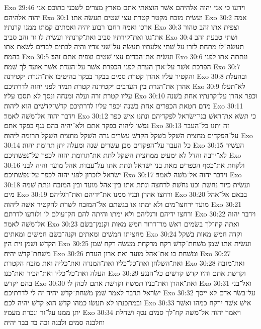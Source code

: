 Exo 29:46  וידעו כי אני יהוה אלהיהם אשׁר הוצאתי אתם מארץ מצרים לשׁכני בתוכם אני יהוה אלהיהם׃
Exo 30:1  ועשׂית מזבח מקטר קטרת עצי שׁטים תעשׂה אתו׃
Exo 30:2  אמה ארכו ואמה רחבו רבוע יהיה ואמתים קמתו ממנו קרנתיו׃
Exo 30:3  וצפית אתו זהב טהור את־גגו ואת־קירתיו סביב ואת־קרנתיו ועשׂית לו זר זהב סביב׃
Exo 30:4  ושׁתי טבעת זהב תעשׂה־לו מתחת לזרו על שׁתי צלעתיו תעשׂה על־שׁני צדיו והיה לבתים לבדים לשׂאת אתו בהמה׃
Exo 30:5  ועשׂית את־הבדים עצי שׁטים וצפית אתם זהב׃
Exo 30:6  ונתתה אתו לפני הפרכת אשׁר על־ארן העדת לפני הכפרת אשׁר על־העדת אשׁר אועד לך שׁמה׃
Exo 30:7  והקטיר עליו אהרן קטרת סמים בבקר בבקר בהיטיבו את־הנרת יקטירנה׃
Exo 30:8  ובהעלת אהרן את־הנרת בין הערבים יקטירנה קטרת תמיד לפני יהוה לדרתיכם׃
Exo 30:9  לא־תעלו עליו קטרת זרה ועלה ומנחה ונסך לא תסכו עליו׃
Exo 30:10  וכפר אהרן על־קרנתיו אחת בשׁנה מדם חטאת הכפרים אחת בשׁנה יכפר עליו לדרתיכם קדשׁ־קדשׁים הוא ליהוה׃
Exo 30:11  וידבר יהוה אל־משׁה לאמר׃
Exo 30:12  כי תשׂא את־ראשׁ בני־ישׂראל לפקדיהם ונתנו אישׁ כפר נפשׁו ליהוה בפקד אתם ולא־יהיה בהם נגף בפקד אתם׃
Exo 30:13  זה יתנו כל־העבר על־הפקדים מחצית השׁקל בשׁקל הקדשׁ עשׂרים גרה השׁקל מחצית השׁקל תרומה ליהוה׃
Exo 30:14  כל העבר על־הפקדים מבן עשׂרים שׁנה ומעלה יתן תרומת יהוה׃
Exo 30:15  העשׁיר לא־ירבה והדל לא ימעיט ממחצית השׁקל לתת את־תרומת יהוה לכפר על־נפשׁתיכם׃
Exo 30:16  ולקחת את־כסף הכפרים מאת בני ישׂראל ונתת אתו על־עבדת אהל מועד והיה לבני ישׂראל לזכרון לפני יהוה לכפר על־נפשׁתיכם׃
Exo 30:17  וידבר יהוה אל־משׁה לאמר׃
Exo 30:18  ועשׂית כיור נחשׁת וכנו נחשׁת לרחצה ונתת אתו בין־אהל מועד ובין המזבח ונתת שׁמה מים׃
Exo 30:19  ורחצו אהרן ובניו ממנו את־ידיהם ואת־רגליהם׃
Exo 30:20  בבאם אל־אהל מועד ירחצו־מים ולא ימתו או בגשׁתם אל־המזבח לשׁרת להקטיר אשׁה ליהוה׃
Exo 30:21  ורחצו ידיהם ורגליהם ולא ימתו והיתה להם חק־עולם לו ולזרעו לדרתם׃
Exo 30:22  וידבר יהוה אל־משׁה לאמר׃
Exo 30:23  ואתה קח־לך בשׂמים ראשׁ מר־דרור חמשׁ מאות וקנמן־בשׂם מחציתו חמשׁים ומאתים וקנה־בשׂם חמשׁים ומאתים׃
Exo 30:24  וקדה חמשׁ מאות בשׁקל הקדשׁ ושׁמן זית הין׃
Exo 30:25  ועשׂית אתו שׁמן משׁחת־קדשׁ רקח מרקחת מעשׂה רקח שׁמן משׁחת־קדשׁ יהיה׃
Exo 30:26  ומשׁחת בו את־אהל מועד ואת ארון העדת׃
Exo 30:27  ואת־השׁלחן ואת־כל־כליו ואת־המנרה ואת־כליה ואת מזבח הקטרת׃
Exo 30:28  ואת־מזבח העלה ואת־כל־כליו ואת־הכיר ואת־כנו׃
Exo 30:29  וקדשׁת אתם והיו קדשׁ קדשׁים כל־הנגע בהם יקדשׁ׃
Exo 30:30  ואת־אהרן ואת־בניו תמשׁח וקדשׁת אתם לכהן לי׃
Exo 30:31  ואל־בני ישׂראל תדבר לאמר שׁמן משׁחת־קדשׁ יהיה זה לי לדרתיכם׃
Exo 30:32  על־בשׂר אדם לא ייסך ובמתכנתו לא תעשׂו כמהו קדשׁ הוא קדשׁ יהיה לכם׃
Exo 30:33  אישׁ אשׁר ירקח כמהו ואשׁר יתן ממנו על־זר ונכרת מעמיו׃
Exo 30:34  ויאמר יהוה אל־משׁה קח־לך סמים נטף ושׁחלת וחלבנה סמים ולבנה זכה בד בבד יהיה׃
